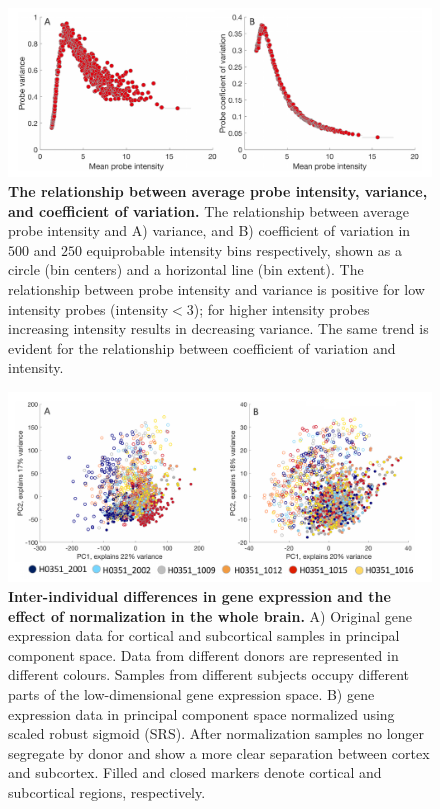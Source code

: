 \begin{figure}[h!]
  \centering
    \includegraphics[width=1\textwidth]{Chapter4/FigureS4.pdf}
\caption{\textbf{The relationship between average probe intensity, variance, and coefficient of variation.}
The relationship between average probe intensity and A) variance, and B) coefficient of variation in $500$ and $250$ equiprobable intensity bins respectively, shown as a circle (bin centers) and a horizontal line (bin extent). The relationship between probe intensity and variance is positive for low intensity probes (intensity$<3$); for higher intensity probes increasing intensity results in decreasing variance. The same trend is evident for the relationship between coefficient of variation and intensity.}
\label{fig:Ch4Sfig4}
\end{figure}

\begin{figure}[h!]
  \centering
    \includegraphics[width=1\textwidth]{Chapter4/FigureS5.pdf}
\caption{\textbf{Inter-individual differences in gene expression and the effect of normalization in the whole brain.}
A) Original gene expression data for cortical and subcortical samples in principal component space. Data from different donors are represented in different colours. Samples from different subjects occupy different parts of the low-dimensional gene expression space. B) gene expression data in principal component space normalized using scaled robust sigmoid (SRS). After normalization samples no longer segregate by donor and show a more clear separation between cortex and subcortex. Filled and closed markers denote cortical and subcortical regions, respectively.}
\label{fig:Ch4Sfig5}
\end{figure}

